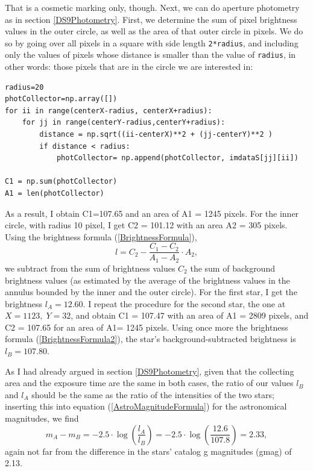\documentclass[twocolumn,apj]{openjournal}
\newcommand{\be}{\begin{equation}}
\newcommand{\ee}{\end{equation}}
\begin{document}
That is a cosmetic marking only, though. Next, we can do aperture photometry as in section \ref{DS9Photometry}. First, we determine the sum of pixel brightness values in the outer circle, as well as the area of that outer circle in pixels. We do so by going over all pixels in a square with side length \verb|2*radius|, and including only the values of pixels whose distance is smaller than the value of \verb|radius|, in other words: those pixels that are in the circle we are interested in:
\begin{lstlisting}
radius=20
photCollector=np.array([])
for ii in range(centerX-radius, centerX+radius):
    for jj in range(centerY-radius,centerY+radius):
        distance = np.sqrt((ii-centerX)**2 + (jj-centerY)**2 )
        if distance < radius:
            photCollector= np.append(photCollector, imdataS[jj][ii])
            
C1 = np.sum(photCollector)
A1 = len(photCollector)
\end{lstlisting}
As a result, I obtain C1=107.65 and an area of A1 = 1245 pixels. For the inner circle, with radius 10 pixel, I get C2 = 101.12 with an area A2 = 305 pixels. Using the brightness formula (\ref{BrightnessFormula}),
\be
l = C_2 - \frac{C_1-C_2}{A_1-A_2}\cdot A_2,
\label{BrightnessFormula2}
\ee
we subtract from the sum of brightness values $C_2$ the sum of background brightness values (as estimated by the average of the brightness values in the annulus bounded by the inner and the outer circle). For the first star, I get the brightness $l_A=12.60$. I repeat the procedure for the second star, the one at $X=1123,\;Y=32$, and obtain C1 = 107.47 with an area of A1 = 2809 pixels, and C2 = 107.65 for an area of A1= 1245 pixels. Using once more the brightness formula (\ref{BrightnessFormula2}), the star's background-subtracted brightness is $l_B= 107.80$.

As I had already argued in section \ref{DS9Photometry}, given that the collecting area and the exposure time are the same in both cases, the ratio of our values $l_B$ and $l_A$ should be the same as the ratio of the intensities of the two stars; inserting this into equation (\ref{AstroMagnitudeFormula}) for the astronomical magnitudes, we find 
\be
m_A-m_B = -2.5\cdot\log\left(\frac{l_A}{l_B}\right) = -2.5\cdot\log\left(\frac{12.6}{107.8}\right) =2.33,
\ee
again not far from the difference in the stars' catalog g magnitudes (gmag) of 2.13. 
\end{document}
